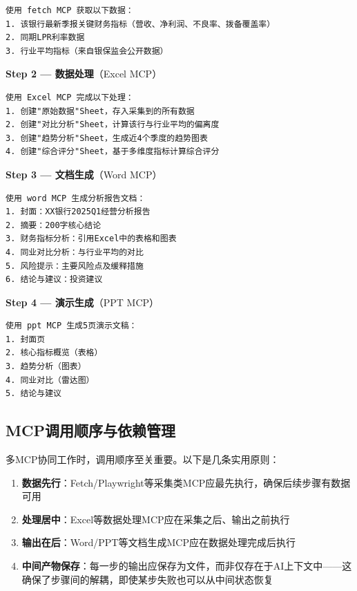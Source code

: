 \begin{lstlisting}
使用 fetch MCP 获取以下数据：
1. 该银行最新季报关键财务指标（营收、净利润、不良率、拨备覆盖率）
2. 同期LPR利率数据
3. 行业平均指标（来自银保监会公开数据）
\end{lstlisting}

\textbf{Step 2 — 数据处理}（Excel MCP）

\begin{lstlisting}
使用 Excel MCP 完成以下处理：
1. 创建"原始数据"Sheet，存入采集到的所有数据
2. 创建"对比分析"Sheet，计算该行与行业平均的偏离度
3. 创建"趋势分析"Sheet，生成近4个季度的趋势图表
4. 创建"综合评分"Sheet，基于多维度指标计算综合评分
\end{lstlisting}

\textbf{Step 3 — 文档生成}（Word MCP）

\begin{lstlisting}
使用 word MCP 生成分析报告文档：
1. 封面：XX银行2025Q1经营分析报告
2. 摘要：200字核心结论
3. 财务指标分析：引用Excel中的表格和图表
4. 同业对比分析：与行业平均的对比
5. 风险提示：主要风险点及缓释措施
6. 结论与建议：投资建议
\end{lstlisting}

\textbf{Step 4 — 演示生成}（PPT MCP）

\begin{lstlisting}
使用 ppt MCP 生成5页演示文稿：
1. 封面页
2. 核心指标概览（表格）
3. 趋势分析（图表）
4. 同业对比（雷达图）
5. 结论与建议
\end{lstlisting}

\subsection{MCP调用顺序与依赖管理}

多MCP协同工作时，调用顺序至关重要。以下是几条实用原则：

\begin{enumerate}[leftmargin=2em]
  \item \textbf{数据先行}：Fetch/Playwright等采集类MCP应最先执行，确保后续步骤有数据可用
  \item \textbf{处理居中}：Excel等数据处理MCP应在采集之后、输出之前执行
  \item \textbf{输出在后}：Word/PPT等文档生成MCP应在数据处理完成后执行
  \item \textbf{中间产物保存}：每一步的输出应保存为文件，而非仅存在于AI上下文中——这确保了步骤间的解耦，即使某步失败也可以从中间状态恢复
\end{enumerate}


